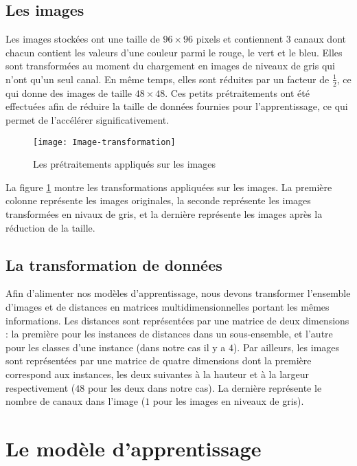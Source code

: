 \subsection{Les images}

Les images stockées ont une taille de $96 \times 96$ pixels et contiennent $3$
canaux dont chacun contient les valeurs d'une couleur parmi le rouge, le vert et
le bleu. Elles sont transformées au moment du chargement en images de niveaux
de gris qui n’ont qu’un seul canal. En même temps, elles sont réduites par un
facteur de $\frac{1}{2}$, ce qui donne des images de taille $48 \times 48$.
Ces petits prétraitements ont été effectuées afin de réduire la taille de données
fournies pour l'apprentissage, ce qui permet de l'accélérer significativement.

\begin{figure}[h]
\centering
\texttt{[image: Image-transformation]}
\caption{Les prétraitements appliqués sur les images\label{fig:img_transform}}
\end{figure}

La figure \ref{fig:img_transform} montre les transformations appliquées
sur les images. La première colonne représente les images originales, la seconde
représente les images transformées en nivaux de gris, et la dernière représente
les images après la réduction de la taille.

\subsection{La transformation de données}

Afin d'alimenter nos modèles d'apprentissage, nous devons transformer l'ensemble
d'images et de distances en matrices multidimensionnelles portant les mêmes
informations. Les distances sont représentées par une matrice de deux dimensions :
la première pour les instances de distances dans un sous-ensemble, et l'autre pour
les classes d'une instance (dans notre cas il y a $4$). Par ailleurs, les images
sont représentées par une matrice de quatre dimensions dont la première correspond
aux instances, les deux suivantes à la hauteur et à la largeur
respectivement ($48$ pour les deux dans notre cas). La dernière représente le
nombre de canaux dans l'image ($1$ pour les images en niveaux de gris).

\section{Le modèle d'apprentissage}

